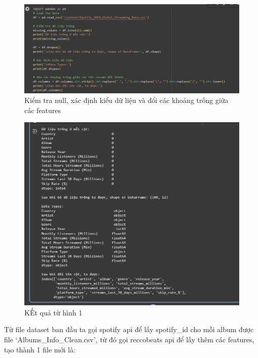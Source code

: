 \begin{figure}[H]
    \centering
    \includegraphics[width=1\linewidth]{../graphics/data2/1.png}
    \caption{Kiểm tra null, xác định kiểu dữ liệu và đổi các khoảng trống giữa các features}
    \label{fig:placeholder}
\end{figure}
\begin{figure}[H]
    \centering
    \includegraphics[width=0.8\linewidth]{../graphics/data2/2.png}
    \caption{KẾt quả từ hình 1}
    \label{fig:placeholder}
\end{figure}
Từ file dataset ban đầu ta gọi spotify api để lấy spotify\_id cho mỗi album được file ‘Albums\_Info\_Clean.csv’, từ đó gọi reccobeats api để lấy thêm các features, tạo thành 1 file mới là:

